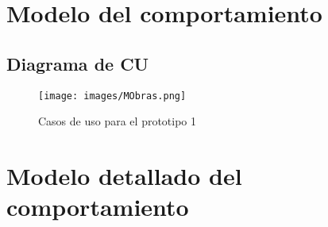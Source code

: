 \chapter{Modelo del comportamiento}

\Instrucciones{}


\section{Diagrama de CU}

 	\begin{figure}[h!]
		\centering
			\texttt{[image: images/MObras.png]}
		\caption{Casos de uso para el prototipo 1}
	\end{figure}

\Instrucciones{}

\chapter{Modelo detallado del comportamiento} 


